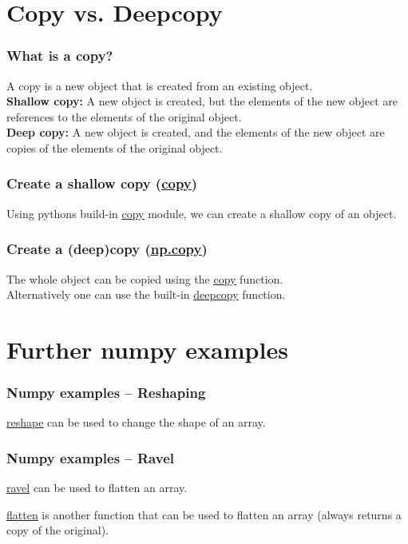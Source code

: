 \documentclass{beamer}
\newcommand{\hrefu}[2]{\underline{\href{#1}{#2}}}
\begin{document}
\section{Copy vs. Deepcopy}
\begin{frame}
  \frametitle{What is a copy?}
  A copy is a new object that is created from an existing object.\\
  \vspace{5mm}
  \textbf{Shallow copy:} A new object is created, but the elements of the new object are references to the elements of the original object.\\
  \vspace{5mm}
  \textbf{Deep copy:} A new object is created, and the elements of the new object are copies of the elements of the original object.
\end{frame}
\begin{frame}
  \frametitle{Create a shallow copy (\hrefu{https://docs.python.org/3/library/copy.html}{copy})}
  Using pythons build-in \hrefu{https://docs.python.org/3/library/copy.html}{copy} module, we can create a shallow copy of an object.\\
  
\end{frame}
\begin{frame}
  \frametitle{Create a (deep)copy (\hrefu{https://numpy.org/doc/stable/reference/generated/numpy.copy.html}{np.copy})}
  The whole object can be copied using the \hrefu{https://numpy.org/doc/stable/reference/generated/numpy.copy.html}{copy} function.\\
  
  Alternatively one can use the built-in \hrefu{https://docs.python.org/3/library/copy.html}{deepcopy} function. 

  

\end{frame}
\section{Further numpy examples}
\begin{frame}
  \frametitle{Numpy examples -- Reshaping}
  \hrefu{https://numpy.org/doc/stable/reference/generated/numpy.reshape.html}{reshape} can be used to change the shape of an array.
  
\end{frame}
\begin{frame}
  \frametitle{Numpy examples -- Ravel}
  \hrefu{https://numpy.org/doc/stable/reference/generated/numpy.ravel.html}{ravel} can be used to flatten an array.
  
  \hrefu{https://numpy.org/doc/stable/reference/generated/numpy.ndarray.flatten.html}{flatten} is another function that can be used to flatten an array (always returns a copy of the original).
\end{frame}


\end{document}
